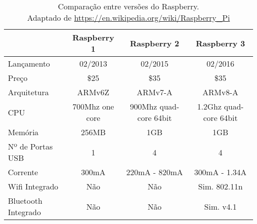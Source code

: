 		\begin{table}[!htb]
			\centering
			\captionsetup{justification=centering}
			\caption[Comparação entre versões do Raspberry PI]{Comparação entre versões do Raspberry. \\Adaptado de \url{https://en.wikipedia.org/wiki/Raspberry_Pi}}
			\label{tbl:versoes_rpi}
			\def\arraystretch{1.5}
			\begin{tabularx}{\textwidth}{m{2.5 cm}| m{3cm} m{3cm} p{3cm}}
				& \multicolumn{1}{c}{\textbf{Raspberry 1}} & %
				\multicolumn{1}{c}{\textbf{Raspberry 2}} & \multicolumn{1}{c}{\textbf{Raspberry 3}} \\ \hline
				
				Lançamento & \multicolumn{1}{c}{02/2013} & %
				\multicolumn{1}{c}{02/2015} & \multicolumn{1}{c}{02/2016} \\
				
				Preço & \multicolumn{1}{c}{\$25} & %
				\multicolumn{1}{c}{\$35} &
				\multicolumn{1}{c}{\$35} \\
				
				Arquitetura & \multicolumn{1}{c}{ARMv6Z} & %
				\multicolumn{1}{c}{ARMv7-A} &
				\multicolumn{1}{c}{ARMv8-A} \\
				
				CPU & \multicolumn{1}{c}{700Mhz one core} & %
				\multicolumn{1}{c}{900Mhz quad-core 64bit} &
				\multicolumn{1}{c}{1.2Ghz quad-core 64bit} \\
				
				Memória & \multicolumn{1}{c}{256MB} & 
				\multicolumn{1}{c}{1GB} &
				\multicolumn{1}{c}{1GB} \\
				
				Nº de Portas USB & \multicolumn{1}{c}{1} &
				\multicolumn{1}{c}{4} &
				\multicolumn{1}{c}{4} \\
				
				Corrente & \multicolumn{1}{c}{300mA} &
				\multicolumn{1}{c}{220mA - 820mA} &
				\multicolumn{1}{c}{300mA - 1.34A} \\
				
				Wifi Integrado & \multicolumn{1}{c}{Não} & %
				\multicolumn{1}{c}{Não} &
				\multicolumn{1}{c}{Sim. 802.11n} \\
				
				Bluetooth Integrado  & \multicolumn{1}{c}{Não} & %
				\multicolumn{1}{c}{Não} &
				\multicolumn{1}{c}{Sim. v4.1} \\
				
				\hline
			\end{tabularx}
		\end{table}
	
